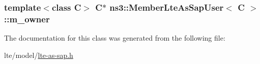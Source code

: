 \subsubsection[{\texorpdfstring{m\+\_\+owner}{m_owner}}]{\setlength{\rightskip}{0pt plus 5cm}template$<$class C$>$ {\bf C}$\ast$ {\bf ns3\+::\+Member\+Lte\+As\+Sap\+User}$<$ {\bf C} $>$\+::m\+\_\+owner\hspace{0.3cm}{\ttfamily [private]}}\hypertarget{classns3_1_1MemberLteAsSapUser_ae66a3dcd670fc10e0a2363f4548bd415}{}\label{classns3_1_1MemberLteAsSapUser_ae66a3dcd670fc10e0a2363f4548bd415}


The documentation for this class was generated from the following file\+:\begin{DoxyCompactItemize}
\item 
lte/model/\hyperlink{lte-as-sap_8h}{lte-\/as-\/sap.\+h}\end{DoxyCompactItemize}
